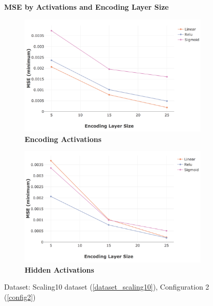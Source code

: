 \documentclass[a4paper,11pt,oneside]{article}
\theoremstyle{plain}
\theoremstyle{definition}
\begin{document}
\begin{figure}[H]
	\centering
	\textbf{MSE by Activations and Encoding Layer Size}
	\begin{subfigure}{.5\textwidth}
		\centering 
		\includegraphics[scale=0.3]{images/results/activations/actual_mse_encoding.png}
		\caption[MSE by Activations and Encoding Layer Size - Encoding Activations]{\textbf{Encoding Activations} 
			\newline }
		\label{figure-actual_mse_encoding_activations}
	\end{subfigure}%
	\begin{subfigure}{.5\textwidth}
		\centering 
		\includegraphics[scale=0.3]{images/results/activations/actual_mse_hidden.png}
		\caption[MSE by Activations and Encoding Layer Size - Hidden Activations]{\textbf{Hidden Activations} 
			\newline }
		\label{figure-actual_mse_hidden_activations}
	\end{subfigure}
	\caption[MSE by Activations and Encoding Layer Size]{Dataset: Scaling10 dataset (\ref{dataset_scaling10}), Configuration 2 (\ref{config2})
}
\end{figure}
\end{document}
